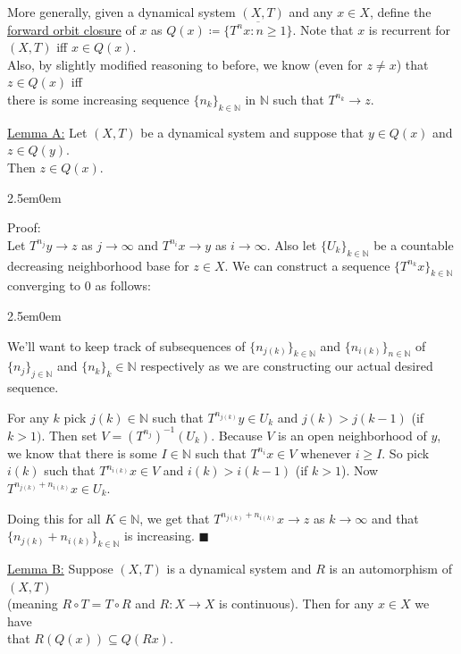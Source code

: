 \documentclass{book}
\newcommand{\pracTwo}{
   \color{Orange}%
   \fontsize{12}{14}\selectfont%
}
\newenvironment{myIndent}{%
   \begin{adjustwidth}{2.5em}{0em}%
}{%
   \end{adjustwidth}%
}
\newcommand{\udefine}[1]{{%
   \setulcolor{Red}%
   \setul{0.14em}{0.07em}%
   \ul{#1}%
}}
\newcommand{\retTwo}{\hfill\bigbreak}
\begin{document}
More generally, given a dynamical system $(X, T)$ and any $x \in X$, define the \udefine{forward orbit closure} of $x$ as $Q(x) \coloneqq \overline{\{T^n x : n \geq 1\}}$. Note that $x$ is recurrent for $(X, T)$ iff $x \in Q(x)$.\\ [1pt] Also, by slightly modified reasoning to before, we know (even for $z \neq x$) that $z \in Q(x)$ iff\\ [1pt] there is some increasing sequence $\{n_k\}_{k \in \mathbb{N}}$ in $\mathbb{N}$ such that $T^{n_k} \to z$. \retTwo

\ul{Lemma A:} Let $(X, T)$ be a dynamical system and suppose that $y \in Q(x)$ and $z \in Q(y)$.\\ Then $z \in Q(x)$.
\begin{myIndent}\pracTwo
	Proof:\\
	Let $T^{n_j}y \to z$ as $j \to \infty$ and $T^{n_i}x \to y$ as $i \to \infty$. Also let $\{U_k\}_{k \in \mathbb{N}}$ be a countable decreasing neighborhood base for $z \in X$. We can construct a sequence $\{T^{n_k}x\}_{k \in \mathbb{N}}$ converging to $0$ as follows:
	\begin{myIndent}
		We'll want to keep track of subsequences of $\{n_{j(k)}\}_{k \in \mathbb{N}}$ and $\{n_{i(k)}\}_{n \in \mathbb{N}}$ of $\{n_j\}_{j \in \mathbb{N}}$ and $\{n_k\}_k \in \mathbb{N}$ respectively as we are constructing our actual desired sequence.\newpage

		For any $k$ pick $j(k) \in \mathbb{N}$ such that $T^{n_{j(k)}}y \in U_k$ and $j(k) > j(k-1)$ (if $k > 1)$. Then set $V = (T^{n_j})^{-1}(U_k)$. Because $V$ is an open neighborhood of $y$, we know that there is some $I \in \mathbb{N}$ such that $T^{n_i}x  \in V$ whenever $i \geq I$. So pick $i(k)$ such that $T^{n_{i(k)}}x \in V$ and $i(k) > i(k-1)$ (if $k > 1$). Now $T^{n_{j(k)} + n_{i(k)}} x \in U_k$.\retTwo

		Doing this for all $K \in \mathbb{N}$, we get that $T^{n_{j(k)} + n_{i(k)}} x \to z$ as $k \to \infty$ and that\\ $\{n_{j(k)} + n_{i(k)}\}_{k \in \mathbb{N}}$ is increasing. $\blacksquare$\retTwo
	\end{myIndent}
\end{myIndent}

\ul{Lemma B:} Suppose $(X, T)$ is a dynamical system and $R$ is an automorphism of $(X, T)$\\ (meaning $R \circ T = T \circ R$ and $R : X \to X$ is continuous). Then for any $x \in X$ we have\\ that $R(Q(x)) \subseteq Q(Rx)$.
\end{document}
